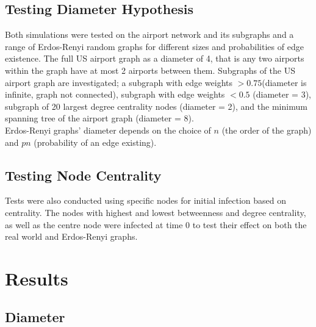 \documentclass[a4paper,11pt]{article}
\begin{document}
\subsection*{Testing Diameter Hypothesis}
Both simulations were tested on the airport network and its subgraphs and a range of Erdos-Renyi random graphs for different sizes and probabilities of edge existence. The full US airport graph as a diameter of 4, that is any two airports within the graph have at most 2 airports between them. Subgraphs of the US airport graph are investigated; a subgraph with edge weights $> 0.75$(diameter is infinite, graph not connected), subgraph with edge weights $<0.5$ (diameter = 3), subgraph of 20 largest degree centrality nodes (diameter = 2), and the minimum spanning tree of the airport graph (diameter = 8).\\
Erdos-Renyi graphs' diameter depends on the choice of $n$ (the order of the graph) and $pn$ (probability of an edge existing).

\subsection*{Testing Node Centrality}
Tests were also conducted using specific nodes for initial infection based on centrality. The nodes with highest and lowest betweenness and degree centrality, as well as the centre node were infected at time 0 to test their effect on both the real world and Erdos-Renyi graphs.

\section{Results}

\subsection*{Diameter}
\end{document}
